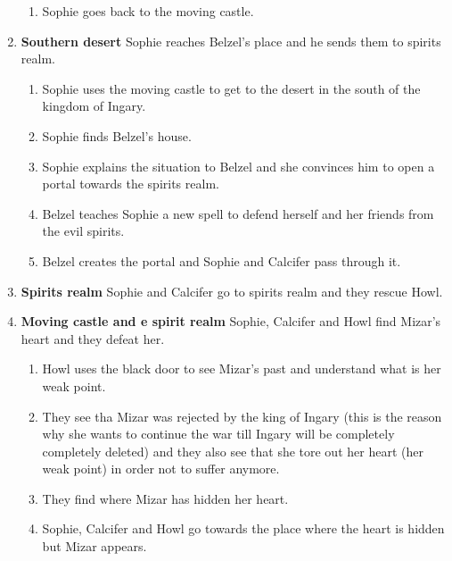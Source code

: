 \begin{enumerate}
\begin{enumerate}
  \item Sophie goes back to the moving castle.
  \end{enumerate}

\item \textbf{Southern desert} Sophie reaches Belzel’s place and he sends them to spirits realm.

  \begin{enumerate}
  \item Sophie uses the moving castle to get to the desert in the south of the kingdom of Ingary.
    
  \item Sophie finds Belzel’s house.
    
  \item Sophie explains the situation to Belzel and she convinces him to open a portal towards the spirits realm.
    
  \item Belzel teaches Sophie a new spell to defend herself and her friends from the evil spirits.
    
  \item Belzel creates the portal and Sophie and Calcifer pass through it.
  \end{enumerate}

\item \textbf{Spirits realm} Sophie and Calcifer go to spirits realm and they rescue Howl.

\item \textbf{Moving castle and e spirit realm}  Sophie, Calcifer and Howl find Mizar’s heart and they defeat her.

  \begin{enumerate}
  \item Howl uses the black door to see Mizar’s past and understand what is her weak point.
    
  \item They see tha Mizar was rejected by the king of Ingary (this is the reason why she wants to continue the war till Ingary will be completely completely deleted) and they also see that she tore out her heart (her weak point) in order not to suffer anymore.
    
  \item They find where Mizar has hidden her heart.
    
  \item Sophie, Calcifer and Howl go towards the place where the heart is hidden but Mizar appears.
    

\end{enumerate}
\end{enumerate}
